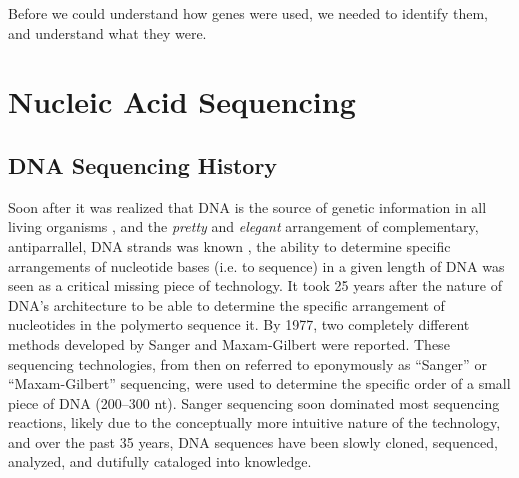    Before we could understand how genes were used, we needed to identify them, and understand what they were. 

\section{Nucleic Acid Sequencing}\label{hd: Nucleic Acid Sequencing}

  \subsection{DNA Sequencing History}\label{sec:DNA Sequencing History}
    Soon after it was realized that DNA is the source of genetic information in all living organisms \citep{Watson1953a}, and the \textit{pretty} and \textit{elegant} arrangement of complementary, antiparrallel, DNA strands was known \citep{Watson2012a}, the ability to determine specific arrangements of nucleotide bases (i.e. to sequence) in a given length of DNA was seen as a critical missing piece of technology. It took 25 years after the nature of DNA's architecture to be able to determine the specific arrangement of nucleotides in the polymer\textemdash to sequence it. By 1977, two completely different methods developed by Sanger \citep{Sanger1975a,Sanger1977b} and Maxam-Gilbert \citep{Maxam1977a} were reported. These sequencing technologies, from then on referred to eponymously as ``Sanger'' or ``Maxam-Gilbert'' sequencing, were used to determine the specific order of a small piece of DNA (200–300 nt). Sanger sequencing soon dominated most sequencing reactions, likely due to the conceptually more intuitive nature of the technology, and over the past 35 years, DNA sequences have been slowly cloned, sequenced, analyzed, and dutifully cataloged into knowledge.

